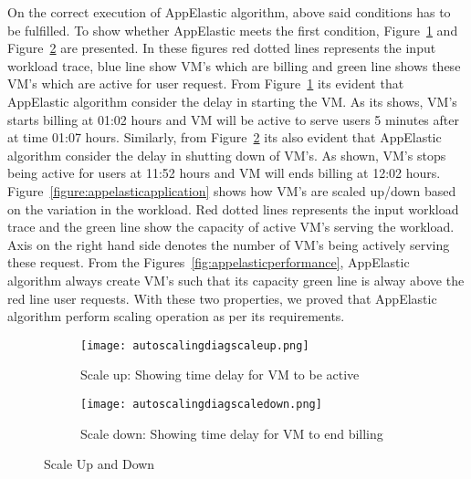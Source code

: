 On the correct execution of AppElastic algorithm, above said conditions has to be fulfilled. To show whether AppElastic meets the first condition, Figure~\ref{figure:billingactivescaleup} and Figure~\ref{figure:billingactivescaledown} are presented. In these figures red dotted lines represents the input workload trace, blue line show VM's which are billing and green line shows these VM's which are active for user request. From Figure~\ref{figure:billingactivescaleup} its evident that AppElastic algorithm consider the delay in starting the VM. As its shows, VM's starts billing at 01:02 hours and VM will be active to serve users 5 minutes after at time 01:07 hours. Similarly, from Figure~\ref{figure:billingactivescaledown} its also evident that AppElastic algorithm consider the delay in shutting down of VM's. As shown, VM's stops being active for users at 11:52 hours and VM will ends billing at 12:02 hours.
\\
Figure~\ref{figure:appelasticapplication} shows how VM's are scaled up/down based on the variation in the workload. Red dotted lines represents the input workload trace and the green line show the capacity of active VM's serving the workload. Axis on the right hand side denotes the number of VM's being actively serving these request. From the Figures~\ref{fig:appelasticperformance}, AppElastic algorithm always create VM's such that its capacity green line is alway above the red line user requests. With these two properties, we proved that AppElastic algorithm perform scaling operation as per its requirements.

\begin{figure}
     \centering
     \begin{subfigure}[b]{1.0\textwidth}
         \texttt{[image: autoscalingdiagscaleup.png]}
         \caption{Scale up: Showing time delay for VM to be active}
         \label{figure:billingactivescaleup}
     \end{subfigure}
     \begin{subfigure}[b]{0.9\textwidth}
         \texttt{[image: autoscalingdiagscaledown.png]}
         \caption{Scale down: Showing time delay for VM to end billing}
         \label{figure:billingactivescaledown}
     \end{subfigure}
     \caption{Scale Up and Down}
     \label{fig:billingactive}
\end{figure}

